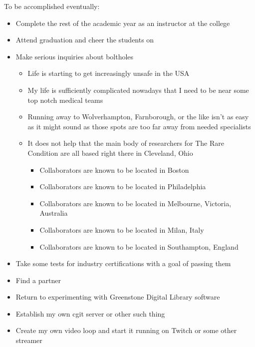 To be accomplished eventually:

\begin{itemize}
\tightlist
\item
  Complete the rest of the academic year as an instructor at the college
\item
  Attend graduation and cheer the students on
\item
  Make serious inquiries about boltholes

  \begin{itemize}
  \tightlist
  \item
    Life is starting to get increasingly unsafe in the USA
  \item
    My life is sufficiently complicated nowadays that I need to be near
    some top notch medical teams
  \item
    Running away to Wolverhampton, Farnborough, or the like isn't as
    easy as it might sound as those spots are too far away from needed
    specialists
  \item
    It does not help that the main body of researchers for The Rare
    Condition are all based right there in Cleveland, Ohio

    \begin{itemize}
    \tightlist
    \item
      Collaborators are known to be located in Boston
    \item
      Collaborators are known to be located in Philadelphia
    \item
      Collaborators are known to be located in Melbourne, Victoria,
      Australia
    \item
      Collaborators are known to be located in Milan, Italy
    \item
      Collaborators are known to be located in Southampton, England
    \end{itemize}
  \end{itemize}
\item
  Take some tests for industry certifications with a goal of passing
  them
\item
  Find a partner
\item
  Return to experimenting with Greenstone Digital Library software
\item
  Establish my own cgit server or other such thing
\item
  Create my own video loop and start it running on Twitch or some other
  streamer
\end{itemize}
